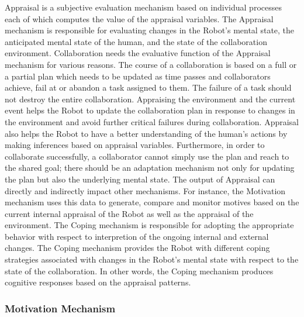 Appraisal is a subjective evaluation mechanism based on individual processes
each of which computes the value of the appraisal variables. The Appraisal
mechanism is responsible for evaluating changes in the Robot's mental state, the
anticipated mental state of the human, and the state of the collaboration
environment. Collaboration needs the evaluative function of the Appraisal
mechanism for various reasons. The course of a collaboration is based on a full
or a partial plan which needs to be updated as time passes and collaborators
achieve, fail at or abandon a task assigned to them. The failure of a task
should not destroy the entire collaboration. Appraising the environment and the
current event helps the Robot to update the collaboration plan in response to
changes in the environment and avoid further critical failures during
collaboration. Appraisal also helps the Robot to have a better understanding of
the human's actions by making inferences based on appraisal variables.
Furthermore, in order to collaborate successfully, a collaborator cannot simply
use the plan and reach to the shared goal; there should be an adaptation
mechanism not only for updating the plan but also the underlying mental state.
The output of Appraisal can directly and indirectly impact other mechanisms. For
instance, the Motivation mechanism uses this data to generate, compare and
monitor motives based on the current internal appraisal of the Robot as well as
the appraisal of the environment. The Coping mechanism is responsible for
adopting the appropriate behavior with respect to interpretion of the ongoing
internal and external changes. The Coping mechanism provides the Robot with
different coping strategies associated with changes in the Robot's mental state
with respect to the state of the collaboration. In other words, the Coping
mechanism produces cognitive responses based on the appraisal patterns.

\subsubsection{Motivation Mechanism}
\label{sec:motivation-mech}

